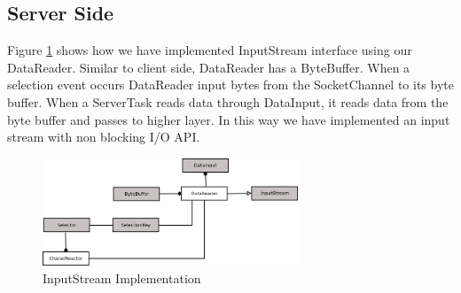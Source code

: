 \subsection{Server Side}
Figure \ref{server} shows how we have implemented InputStream interface using our DataReader. Similar to client side, DataReader has a ByteBuffer. When a selection event occurs DataReader input bytes from the SocketChannel to its byte buffer. When a ServerTask reads data through DataInput, it reads data from the byte buffer and passes to higher layer. In this way we have implemented an input stream with non blocking I/O API.
\begin{figure}[!t]
        \centering
        \includegraphics[width=3.0in]{server.png}
        \caption{InputStream Implementation}
        \label{server}
\end{figure}

